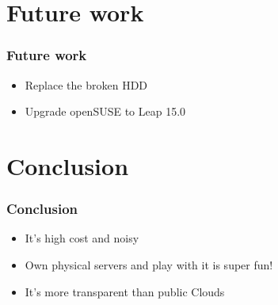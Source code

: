 \documentclass[aspectratio=169,11pt,hyperref={colorlinks=true}]{beamer}
\begin{document}
\section{Future work}
\begin{frame}
  \frametitle{Future work}
  \begin{itemize}
    \item Replace the broken HDD
    \item Upgrade openSUSE to Leap 15.0
  \end{itemize}
\end{frame}

\section{Conclusion}
\begin{frame}
  \frametitle{Conclusion}
  \begin{itemize}
    \item It's high cost and noisy
    \item Own physical servers and play with it is super fun!
    \item It's more transparent than public Clouds
  \end{itemize}
\end{frame}
\end{document}
